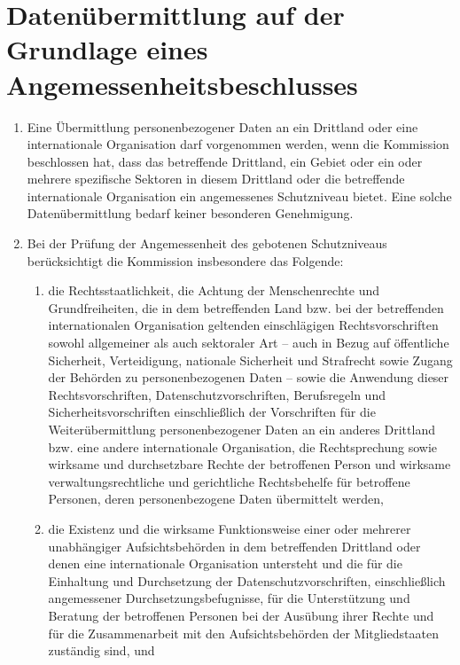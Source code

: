 \chapter{Datenübermittlung auf der Grundlage eines Angemessenheitsbeschlusses}
\label{ch:45}


\begin{enumerate}

  \item Eine Übermittlung personenbezogener Daten an ein Drittland oder eine internationale Organisation darf
   vorgenommen werden, wenn die Kommission beschlossen hat, dass das betreffende Drittland, ein Gebiet oder ein oder
   mehrere spezifische Sektoren in diesem Drittland oder die betreffende internationale Organisation ein angemessenes
   Schutzniveau bietet. Eine solche Datenübermittlung bedarf keiner besonderen Genehmigung.
  \label{itm:45-1}

  \item Bei der Prüfung der Angemessenheit des gebotenen Schutzniveaus berücksichtigt die Kommission insbesondere das
   Folgende:
  \label{itm:45-2}

  \begin{enumerate}
  
    \item die Rechtsstaatlichkeit, die Achtung der Menschenrechte und Grundfreiheiten, die in dem betreffenden Land bzw.
     bei der betreffenden internationalen Organisation geltenden einschlägigen Rechtsvorschriften sowohl allgemeiner
     als auch sektoraler Art -- auch in Bezug auf öffentliche Sicherheit, Verteidigung, nationale Sicherheit und
     Strafrecht sowie Zugang der Behörden zu personenbezogenen Daten -- sowie die Anwendung dieser Rechtsvorschriften,
     Datenschutzvorschriften, Berufsregeln und Sicherheitsvorschriften einschließlich der Vorschriften für die
     Weiterübermittlung personenbezogener Daten an ein anderes Drittland bzw. eine andere internationale Organisation,
     die Rechtsprechung sowie wirksame und durchsetzbare Rechte der betroffenen Person und wirksame
     verwaltungsrechtliche und gerichtliche Rechtsbehelfe für betroffene Personen, deren personenbezogene Daten
     übermittelt werden,
    \label{itm:45-2a}

    \item die Existenz und die wirksame Funktionsweise einer oder mehrerer unabhängiger Aufsichtsbehörden in dem
     betreffenden Drittland oder denen eine internationale Organisation untersteht und die für die Einhaltung und
     Durchsetzung der Datenschutzvorschriften, einschließlich angemessener Durchsetzungsbefugnisse, für die
     Unterstützung und Beratung der betroffenen Personen bei der Ausübung ihrer Rechte und für die Zusammenarbeit mit
     den Aufsichtsbehörden der Mitgliedstaaten zuständig sind, und
    \label{itm:45-2b}


\end{enumerate}
\end{enumerate}
